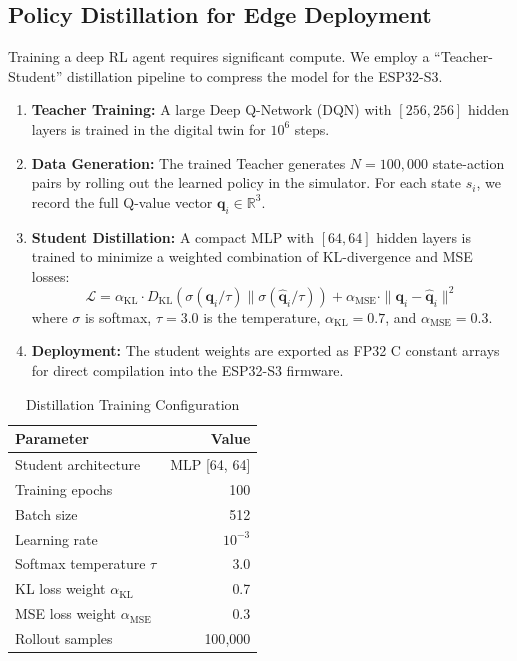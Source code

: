 \subsection{Policy Distillation for Edge Deployment}
\label{subsec:distillation}

Training a deep RL agent requires significant compute. We employ a ``Teacher-Student'' distillation pipeline to compress the model for the ESP32-S3.

\begin{enumerate}
    \item \textbf{Teacher Training:} A large Deep Q-Network (DQN) with $[256, 256]$ hidden layers is trained in the digital twin for $10^6$ steps.

    \item \textbf{Data Generation:} The trained Teacher generates $N = 100{,}000$ state-action pairs by rolling out the learned policy in the simulator. For each state $s_i$, we record the full Q-value vector $\mathbf{q}_i \in \mathbb{R}^3$.

    \item \textbf{Student Distillation:} A compact MLP with $[64, 64]$ hidden layers is trained to minimize a weighted combination of KL-divergence and MSE losses:
    \begin{equation}
        \mathcal{L} = \alpha_{\text{KL}} \cdot D_{\text{KL}}\!\left(\sigma(\mathbf{q}_i / \tau) \| \sigma(\hat{\mathbf{q}}_i / \tau)\right) + \alpha_{\text{MSE}} \cdot \|\mathbf{q}_i - \hat{\mathbf{q}}_i\|^2
    \end{equation}
    where $\sigma$ is softmax, $\tau = 3.0$ is the temperature, $\alpha_{\text{KL}} = 0.7$, and $\alpha_{\text{MSE}} = 0.3$.

    \item \textbf{Deployment:} The student weights are exported as FP32 C constant arrays for direct compilation into the ESP32-S3 firmware.
\end{enumerate}

\begin{table}[htbp]
\caption{Distillation Training Configuration}
\label{tab:distill_config}
\centering
\begin{tabular}{@{}lr@{}}
\toprule
\textbf{Parameter} & \textbf{Value} \\
\midrule
Student architecture & MLP [64, 64] \\
Training epochs & 100 \\
Batch size & 512 \\
Learning rate & $10^{-3}$ \\
Softmax temperature $\tau$ & 3.0 \\
KL loss weight $\alpha_{\text{KL}}$ & 0.7 \\
MSE loss weight $\alpha_{\text{MSE}}$ & 0.3 \\
Rollout samples & 100{,}000 \\
\bottomrule
\end{tabular}
\end{table}

